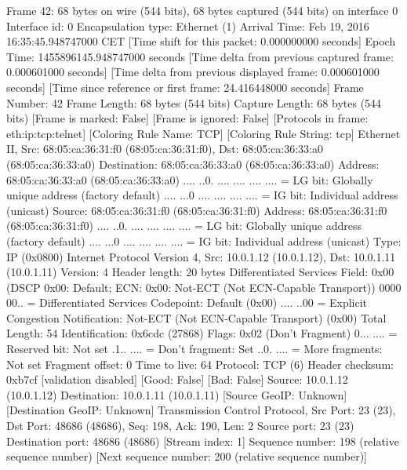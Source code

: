 Frame 42: 68 bytes on wire (544 bits), 68 bytes captured (544 bits) on interface 0
    Interface id: 0
    Encapsulation type: Ethernet (1)
    Arrival Time: Feb 19, 2016 16:35:45.948747000 CET
    [Time shift for this packet: 0.000000000 seconds]
    Epoch Time: 1455896145.948747000 seconds
    [Time delta from previous captured frame: 0.000601000 seconds]
    [Time delta from previous displayed frame: 0.000601000 seconds]
    [Time since reference or first frame: 24.416448000 seconds]
    Frame Number: 42
    Frame Length: 68 bytes (544 bits)
    Capture Length: 68 bytes (544 bits)
    [Frame is marked: False]
    [Frame is ignored: False]
    [Protocols in frame: eth:ip:tcp:telnet]
    [Coloring Rule Name: TCP]
    [Coloring Rule String: tcp]
Ethernet II, Src: 68:05:ca:36:31:f0 (68:05:ca:36:31:f0), Dst: 68:05:ca:36:33:a0 (68:05:ca:36:33:a0)
    Destination: 68:05:ca:36:33:a0 (68:05:ca:36:33:a0)
        Address: 68:05:ca:36:33:a0 (68:05:ca:36:33:a0)
        .... ..0. .... .... .... .... = LG bit: Globally unique address (factory default)
        .... ...0 .... .... .... .... = IG bit: Individual address (unicast)
    Source: 68:05:ca:36:31:f0 (68:05:ca:36:31:f0)
        Address: 68:05:ca:36:31:f0 (68:05:ca:36:31:f0)
        .... ..0. .... .... .... .... = LG bit: Globally unique address (factory default)
        .... ...0 .... .... .... .... = IG bit: Individual address (unicast)
    Type: IP (0x0800)
Internet Protocol Version 4, Src: 10.0.1.12 (10.0.1.12), Dst: 10.0.1.11 (10.0.1.11)
    Version: 4
    Header length: 20 bytes
    Differentiated Services Field: 0x00 (DSCP 0x00: Default; ECN: 0x00: Not-ECT (Not ECN-Capable Transport))
        0000 00.. = Differentiated Services Codepoint: Default (0x00)
        .... ..00 = Explicit Congestion Notification: Not-ECT (Not ECN-Capable Transport) (0x00)
    Total Length: 54
    Identification: 0x6cdc (27868)
    Flags: 0x02 (Don't Fragment)
        0... .... = Reserved bit: Not set
        .1.. .... = Don't fragment: Set
        ..0. .... = More fragments: Not set
    Fragment offset: 0
    Time to live: 64
    Protocol: TCP (6)
    Header checksum: 0xb7cf [validation disabled]
        [Good: False]
        [Bad: False]
    Source: 10.0.1.12 (10.0.1.12)
    Destination: 10.0.1.11 (10.0.1.11)
    [Source GeoIP: Unknown]
    [Destination GeoIP: Unknown]
Transmission Control Protocol, Src Port: 23 (23), Dst Port: 48686 (48686), Seq: 198, Ack: 190, Len: 2
    Source port: 23 (23)
    Destination port: 48686 (48686)
    [Stream index: 1]
    Sequence number: 198    (relative sequence number)
    [Next sequence number: 200    (relative sequence number)]
